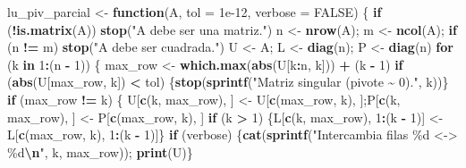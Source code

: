 \documentclass[
]{book}
\newenvironment{Shaded}{\begin{snugshade}}{\end{snugshade}}
\newcommand{\AttributeTok}[1]{\textcolor[rgb]{0.13,0.29,0.53}{#1}}
\newcommand{\ConstantTok}[1]{\textcolor[rgb]{0.56,0.35,0.01}{#1}}
\newcommand{\ControlFlowTok}[1]{\textcolor[rgb]{0.13,0.29,0.53}{\textbf{#1}}}
\newcommand{\DecValTok}[1]{\textcolor[rgb]{0.00,0.00,0.81}{#1}}
\newcommand{\FloatTok}[1]{\textcolor[rgb]{0.00,0.00,0.81}{#1}}
\newcommand{\FunctionTok}[1]{\textcolor[rgb]{0.13,0.29,0.53}{\textbf{#1}}}
\newcommand{\NormalTok}[1]{#1}
\newcommand{\OtherTok}[1]{\textcolor[rgb]{0.56,0.35,0.01}{#1}}
\newcommand{\SpecialCharTok}[1]{\textcolor[rgb]{0.81,0.36,0.00}{\textbf{#1}}}
\newcommand{\StringTok}[1]{\textcolor[rgb]{0.31,0.60,0.02}{#1}}
\begin{document}
\begin{Shaded}
\begin{Highlighting}[]
\NormalTok{lu\_piv\_parcial }\OtherTok{\textless{}{-}} \ControlFlowTok{function}\NormalTok{(A, }\AttributeTok{tol =} \FloatTok{1e{-}12}\NormalTok{, }\AttributeTok{verbose =} \ConstantTok{FALSE}\NormalTok{) \{}
  \ControlFlowTok{if}\NormalTok{ (}\SpecialCharTok{!}\FunctionTok{is.matrix}\NormalTok{(A)) }\FunctionTok{stop}\NormalTok{(}\StringTok{"A debe ser una matriz."}\NormalTok{)}
\NormalTok{  n }\OtherTok{\textless{}{-}} \FunctionTok{nrow}\NormalTok{(A); m }\OtherTok{\textless{}{-}} \FunctionTok{ncol}\NormalTok{(A); }\ControlFlowTok{if}\NormalTok{ (n }\SpecialCharTok{!=}\NormalTok{ m) }\FunctionTok{stop}\NormalTok{(}\StringTok{"A debe ser cuadrada."}\NormalTok{)}
\NormalTok{  U }\OtherTok{\textless{}{-}}\NormalTok{ A;  L }\OtherTok{\textless{}{-}} \FunctionTok{diag}\NormalTok{(n);  P }\OtherTok{\textless{}{-}} \FunctionTok{diag}\NormalTok{(n)}
  \ControlFlowTok{for}\NormalTok{ (k }\ControlFlowTok{in} \DecValTok{1}\SpecialCharTok{:}\NormalTok{(n }\SpecialCharTok{{-}} \DecValTok{1}\NormalTok{)) \{}
\NormalTok{    max\_row }\OtherTok{\textless{}{-}} \FunctionTok{which.max}\NormalTok{(}\FunctionTok{abs}\NormalTok{(U[k}\SpecialCharTok{:}\NormalTok{n, k])) }\SpecialCharTok{+}\NormalTok{ (k }\SpecialCharTok{{-}} \DecValTok{1}\NormalTok{)}
    \ControlFlowTok{if}\NormalTok{ (}\FunctionTok{abs}\NormalTok{(U[max\_row, k]) }\SpecialCharTok{\textless{}}\NormalTok{ tol) \{}\FunctionTok{stop}\NormalTok{(}\FunctionTok{sprintf}\NormalTok{(}\StringTok{"Matriz singular (pivote \textasciitilde{} 0)."}\NormalTok{, k))\}}
    \ControlFlowTok{if}\NormalTok{ (max\_row }\SpecialCharTok{!=}\NormalTok{ k) \{}
\NormalTok{      U[}\FunctionTok{c}\NormalTok{(k, max\_row), ] }\OtherTok{\textless{}{-}}\NormalTok{ U[}\FunctionTok{c}\NormalTok{(max\_row, k), ];P[}\FunctionTok{c}\NormalTok{(k, max\_row), ] }\OtherTok{\textless{}{-}}\NormalTok{ P[}\FunctionTok{c}\NormalTok{(max\_row, k), ]}
      \ControlFlowTok{if}\NormalTok{ (k }\SpecialCharTok{\textgreater{}} \DecValTok{1}\NormalTok{) \{L[}\FunctionTok{c}\NormalTok{(k, max\_row), }\DecValTok{1}\SpecialCharTok{:}\NormalTok{(k }\SpecialCharTok{{-}} \DecValTok{1}\NormalTok{)] }\OtherTok{\textless{}{-}}\NormalTok{ L[}\FunctionTok{c}\NormalTok{(max\_row, k), }\DecValTok{1}\SpecialCharTok{:}\NormalTok{(k }\SpecialCharTok{{-}} \DecValTok{1}\NormalTok{)]\}}
      \ControlFlowTok{if}\NormalTok{ (verbose) \{}\FunctionTok{cat}\NormalTok{(}\FunctionTok{sprintf}\NormalTok{(}\StringTok{"Intercambia filas \%d \textless{}{-}\textgreater{} \%d}\SpecialCharTok{\textbackslash{}n}\StringTok{"}\NormalTok{, k, max\_row)); }\FunctionTok{print}\NormalTok{(U)\}}

\end{Highlighting}
\end{Shaded}
\end{document}

